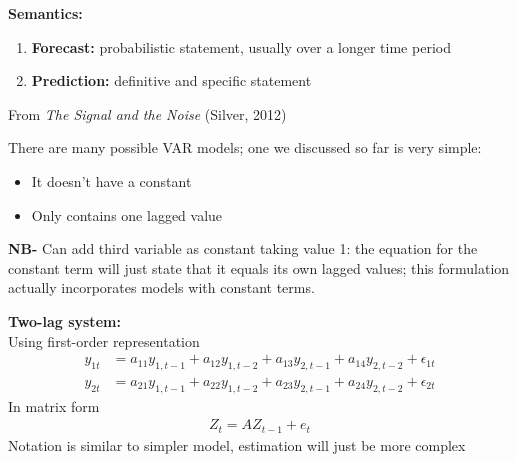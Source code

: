 \documentclass{beamer}
\begin{document}
\begin{frame}
  \textbf{Semantics:}
  \medskip
  \begin{enumerate}
    \item \textbf{Forecast:} probabilistic statement, usually over a longer time period\\    
    \item \textbf{Prediction:} definitive and specific statement 
  \end{enumerate}
  \medskip
  From \textit{The Signal and the Noise} (Silver, 2012)
\end{frame}

\begin{frame}
  There are many possible VAR models; one we discussed so far is very simple:  
  \begin{itemize}
  \item It doesn't have a constant
  \item Only contains one lagged value
  \end{itemize}
  \medskip
  \textbf{NB-} Can add third variable as constant taking value 1: the equation for the constant term will just state that it equals its own lagged values; this formulation actually incorporates models with constant terms.
\end{frame}

\begin{frame}
  \textbf{Two-lag system:}\\ Using first-order representation
  \begin{align}
    y_{1t} &= a_{11} y_{1, t-1} + a_{12} y_{1,t-2} + a_{13} y_{2, t-1} + a_{14} y_{2,t-2} + \epsilon_{1t}\\
    y_{2t} &= a_{21} y_{1, t-1} + a_{22} y_{1,t-2} + a_{23} y_{2, t-1} + a_{24} y_{2,t-2} + \epsilon_{2t}
  \end{align}
  \medskip
  In matrix form
  \begin{align}  
    Z_t = AZ_{t-1} + e_t 
  \end{align}
  \medskip
  Notation is similar to simpler model, estimation will just be more complex  
\end{frame}
\end{document}
